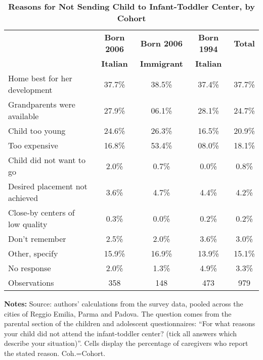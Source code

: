 \begin{table}[ht!]
\caption{\textbf{Reasons for Not Sending Child to Infant-Toddler Center, by Cohort}}
\label{tab:SumMotiveNOAsilo}
\begin{center}
 \scriptsize
 \begin{tabular}{ l c c c c }
\hline\hline
& \textbf{Born 2006} & \textbf{Born 2006} & \textbf{Born 1994} & \textbf{Total} \\
& \textbf{Italian} & \textbf{Immigrant} & \textbf{Italian} & \textbf{} \\
\hline
Home best for her development    & 37.7\% & 38.5\% & 37.4\% & 37.7\% \\[0.2em]
Grandparents were available      & 27.9\% & 06.1\% & 28.1\% & 24.7\% \\[0.2em]
Child too young                  & 24.6\% & 26.3\% & 16.5\% & 20.9\% \\[0.2em]
Too expensive                    & 16.8\% & 53.4\% & 08.0\% & 18.1\% \\[0.2em]
Child did not want to go         &  2.0\% &  0.7\% &  0.0\% &  0.8\% \\[0.2em]
Desired placement not achieved   &  3.6\% &  4.7\% &  4.4\% &  4.2\% \\[0.2em]
Close-by centers of low quality  &  0.3\% &  0.0\% &  0.2\% &  0.2\% \\[0.2em]
Don't remember                   &  2.5\% &  2.0\% &  3.6\% &  3.0\% \\[0.2em]
Other, specify                   & 15.9\% & 16.9\% & 13.9\% & 15.1\% \\[0.2em]
No response                      &  2.0\% &  1.3\% &  4.9\% &  3.3\% \\
\hline
Observations                     &  358  &  148  &  473  &  979\\
\hline
\end{tabular}
\end{center} \begin{flushleft}
\tiny{{\bfseries Notes:} Source: authors' calculations from the survey data, pooled across the cities of Reggio Emilia, Parma and Padova. The question comes from the parental section of the children and adolescent questionnaires: ``For what reasons your child did not attend the infant-toddler center? (tick all answers which describe your situation)''. Cells display the percentage of caregivers who report the stated reason. Coh.=Cohort.}
\end{flushleft} \end{table}
